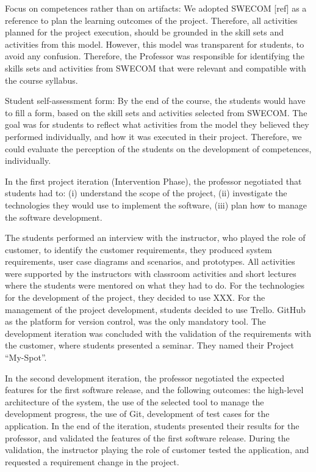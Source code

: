 Focus on competences rather than on artifacts: We adopted SWECOM [ref] as a reference to plan the learning outcomes of the project. Therefore, all activities planned for the project execution, should be grounded in the skill sets and activities from this model. However, this model was transparent for students, to avoid any confusion. Therefore, the Professor was responsible for identifying the skills sets and activities from SWECOM that were relevant and compatible with the course syllabus.

Student self-assessment form: By the end of the course, the students would have to fill a form, based on the skill sets and activities selected from SWECOM. The goal was for students to reflect what activities from the model they believed they performed individually, and how it was executed in their project. Therefore, we could evaluate the perception of the students on the development of competences, individually.

In the first project iteration (Intervention Phase), the professor negotiated that students had to: (i) understand the scope of the project, (ii) investigate the technologies they would use to implement the software, (iii) plan how to manage the software development.

The students performed an interview with the instructor, who played the role of customer, to identify the customer requirements, they produced system requirements, user case diagrams and scenarios, and prototypes. All activities were supported by the instructors with classroom activities and short lectures where the students were mentored on what they had to do. For the technologies for the development of the project, they decided to use XXX. For the management of the project development, students decided to use Trello. GitHub as the platform for version control, was the only mandatory tool. The development iteration was concluded with the validation of the requirements with the customer, where students presented a seminar. They named their Project “My-Spot”.

In the second development iteration, the professor negotiated the expected features for the first software release, and the following outcomes: the high-level architecture of the system, the use of the selected tool to manage the development progress, the use of Git, development of test cases for the application. In the end of the iteration, students presented their results for the professor, and validated the features of the first software release. During the validation, the instructor playing the role of customer tested the application, and requested a requirement change in the project.

